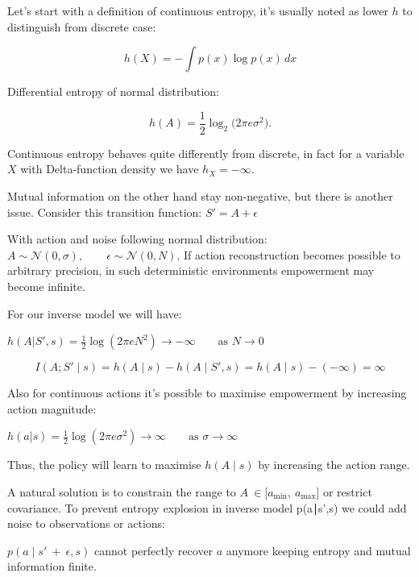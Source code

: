 Let's start with a definition of continuous entropy, it's usually noted as lower $h$ to distinguish from discrete case:

\begin{equation}
h(X)	= -\int p(x)\log p(x)\,dx
\end{equation}

Differential entropy of normal distribution:

\begin{equation}
	h(A) = \frac{1}{2}\log_{2}\bigl(2\pi e\sigma^{2}\bigr).
	\label{eq:gaussian-differential-entropy}
\end{equation}

Continuous entropy behaves quite differently from discrete, in fact for a variable $X$ with Delta-function density we have $h_{X} = - \infty$.

Mutual information on the other hand stay non-negative, but there is another issue. Consider this transition function:
$S'=A+\epsilon$

With action and noise following normal distribution:
$A\sim\mathcal{N}(0, \sigma),\qquad \epsilon\sim\mathcal{N}(0,N)$. If action reconstruction becomes possible to arbitrary precision, in such deterministic environments empowerment may become infinite.

For our inverse model we will have:

$ h(A| S', s)=\frac{1}{2}\log(2\pi e N^2)
\longrightarrow
-\infty
\qquad
\text{as }N\to 0$

\begin{equation}
I(A;S'\mid s)
= h(A\mid s)-h(A\mid S',s)
= h(A\mid s)-(-\infty)
= \infty
\label{eq:continuous-empowerment-infinite}
\end{equation}


Also for continuous actions it's possible to maximise empowerment by increasing action magnitude:

$ h(a|s) =
\frac{1}{2}\log(2\pi e\sigma^2)
\longrightarrow
\infty
\qquad
\text{as }\sigma\to \infty$

Thus, the policy will learn to maximise $h(A\mid s)$ by increasing the action range.

A natural solution is to constrain the range to $A\  \in \lbrack a_{\min},\ a_{\max}\rbrack$ or restrict covariance. To prevent entropy explosion in inverse model p(a∣s',s) we could add noise to observations or actions:

$p(a \mid s'\  + \ \epsilon,s)$ cannot perfectly recover $a$ anymore keeping entropy and mutual information finite.

